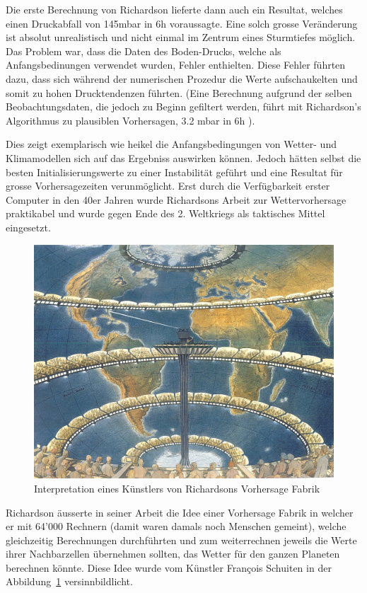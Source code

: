 \begin{refsection}
Die erste Berechnung von Richardson lieferte dann auch ein Resultat, welches einen Druckabfall von 145mbar in 6h voraussagte. Eine solch grosse Veränderung ist absolut unrealistisch und nicht einmal im Zentrum eines Sturmtiefes möglich. Das Problem war, dass die Daten des Boden-Drucks, welche als Anfangsbedinungen verwendet wurden, Fehler enthielten. Diese Fehler führten dazu, dass sich während der numerischen Prozedur die Werte aufschaukelten und somit zu hohen Drucktendenzen führten. (Eine Berechnung aufgrund der selben Beobachtungsdaten, die jedoch zu Beginn gefiltert werden, führt mit Richardson's Algorithmus zu plausiblen Vorhersagen, 3.2 mbar in 6h \cite{klima:stocker}).

Dies zeigt exemplarisch wie heikel die Anfangsbedingungen von Wetter- und Klimamodellen sich auf das Ergebniss auswirken können. Jedoch hätten selbst die besten Initialisierungswerte zu einer Instabilität geführt und eine Resultat für grosse Vorhersagezeiten verunmöglicht. Erst durch die Verfügbarkeit erster Computer in den 40er Jahren wurde Richardsons Arbeit zur  Wettervorhersage praktikabel und wurde gegen Ende des 2. Weltkriegs als taktisches Mittel eingesetzt.

\begin{figure}
\centering
\includegraphics{klima/64000.jpg}
\caption{Interpretation eines Künstlers von Richardsons Vorhersage Fabrik \cite{klima:biography}
\label{klima:geschichte:richardson}}
\end{figure}

Richardson äusserte in seiner Arbeit die Idee einer Vorhersage Fabrik in welcher er mit 64'000 Rechnern (damit waren damals noch Menschen gemeint), welche gleichzeitig Berechnungen durchführten und zum weiterrechnen jeweils die Werte ihrer Nachbarzellen übernehmen sollten, das Wetter für den ganzen Planeten berechnen könnte. Diese Idee wurde vom Künstler François Schuiten in der Abbildung~\ref{klima:geschichte:richardson} versinnbildlicht.


\end{refsection}
